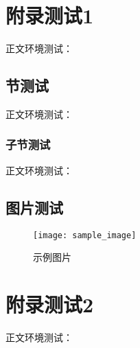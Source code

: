 \chapter{附录测试1}
正文环境测试：\sampletext

\section{节测试}
正文环境测试：\sampletext

\subsection{子节测试}
正文环境测试：\sampletext

\section{图片测试}
\begin{figure}[h]
    \centering
    \texttt{[image: sample\_image]}
    \caption{示例图片}
\end{figure}

\chapter{附录测试2}
正文环境测试：\sampletext
